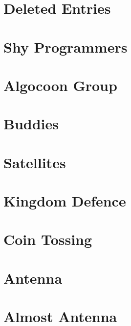\documentclass[a4paper, 10pt]{article}
\let\stdsection\section
\renewcommand\section{\newpage\stdsection}
\newcommand{\includecode}[1]{
    }
\begin{document}
    \section{Deleted Entries}
        \includecode{../problems/w04/Deleted_Entries/DeletedEntries1.cpp}
    
    \section{Shy Programmers}
        \includecode{../problems/w04/Shy_Programmers/ShyProgrammers1.cpp}

    
    \section{Algocoon Group}
        \includecode{../problems/w05/Buddies/Buddies1.cpp}
        
    \section{Buddies}
        \includecode{../problems/w05/Buddies/Buddies1.cpp}
        
    \section{Satellites}
        \includecode{../problems/w05/Satellites/Satellites1.cpp}
        
    \section{Kingdom Defence}
        \includecode{../problems/w05/Kingdom_Defense/KingdomDefence1.cpp}
    
    \section{Coin Tossing}
        \includecode{../problems/w05/Coin_Tossing/CoinToss1.cpp}
          

    \section{Antenna}
        \includecode{../problems/w06/Antenna/Antenna1.cpp}
        
    \section{Almost Antenna}
        \includecode{../problems/w06/AlmostAntenna/AlmostAntenna1.cpp}
        
\end{document}
